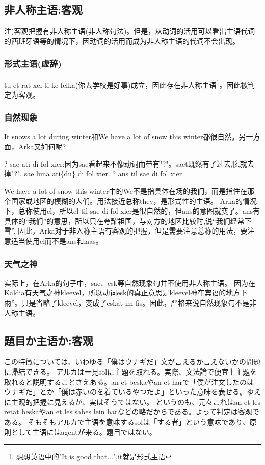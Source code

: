 \subsection{非人称主语:客观}

注)客观把握有非人称主语(非人称句法)。但是，从动词的活用可以看出主语代词的西班牙语等的情况下，因动词的活用而成为非人称主语的代词不会出现。

\subsubsection{形式主语(虚辞)}

tu et rat xel ti ke felka(你去学校是好事)成立，因此存在非人称主语\footnote{想想英语中的"It is good that...",it就是形式主语}。因此被判定为客观。

\subsubsection{自然现象}

It snows a lot during winter和We have a lot of snow this winter都很自然。另一方面，Arka又如何呢?

? sae ati di fol xier:因为sae看起来不像动词而带有"?"。saet既然有了过去形,就去掉"?".
sae luna ati\{du\} di fol xier.
? ans til sae di fol xier

We have a lot of snow this winter中的We不是指具体在场的我们，而是指住在那个国家或地区的模糊的人们。用法接近总称they，是形式性的主语。
Arka的情况下，总称使用el，所以el til sae di fol xier是很自然的，但ans的意图就变了。ans有具体的“我们”的意思，所以只在夸耀祖国，与对方的地区比较时,说“我们经常下雪”.
因此，Arka对于非人称主语有客观的把握，但是需要注意总称的用法，要注意适当使用el而不是ans和laas。

\subsubsection{天气之神}

实际上，在Arka的句子中，sae、esk等自然现象句并不使用非人称主语。
因为在Kaldia有天气之神kleevel，所以动词esk的真正意思是kleevel神在宾语的地方下雨”。只是省略了kleevel，变成了eskat im fis。因此，严格来说自然现象句不是非人称主语。

\subsection{題目か主语か:客观}

この特徴については、いわゆる「僕はウナギだ」文が言えるか言えないかの問題に帰結できる。
アルカは一見solに主題を取れる。実際、文法論で便宜上主題を取れると説明することさえある。an et beskaやan et harで「僕が注文したのはウナギだ」とか「僕は赤いのを着ているやつだよ」といった意味を表せる。ゆえに主观的把握に見えるが、実はそうではない。
というのも、元々これはan et les retat beskaやan et les sabes lein harなどの略だからである。よって判定は客观である。
そもそもアルカで主语を意味するsolは「する者」という意味であり、原則として主语にはagentが来る。題目ではない。

